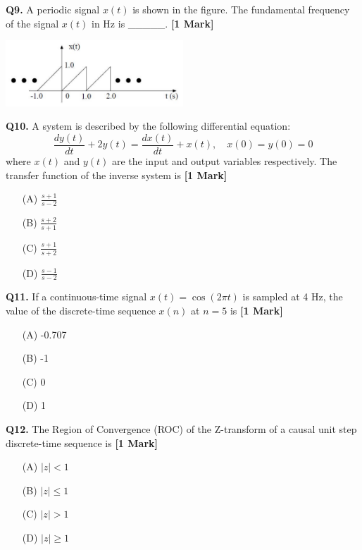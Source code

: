 \documentclass[11pt]{article}
\newcommand{\questiona}[2]{
    \noindent\textbf{Q#2.} #1 \hfill \textbf{[1 Mark]}
}
\begin{document}
\questiona{A periodic signal \( x(t) \) is shown in the figure. The fundamental frequency of the signal \( x(t) \) in Hz is \_\_\_\_\_.}{9}
\begin{center}
\includegraphics[width=0.5\textwidth]{figures/9.png}
\end{center}
\vspace{0.5cm}

\questiona{A system is described by the following differential equation:
\[\frac{dy(t)}{dt} + 2y(t) = \frac{dx(t)}{dt} + x(t), \quad x(0) = y(0) = 0\]
where \( x(t) \) and \( y(t) \) are the input and output variables respectively. The transfer function of the inverse system is}{10}
\begin{enumerate}
    \item[(A)] \(\frac{s+1}{s-2}\)  
    \item[(B)] \(\frac{s+2}{s+1}\)  
    \item[(C)] \(\frac{s+1}{s+2}\)  
    \item[(D)] \(\frac{s-1}{s-2}\)
\end{enumerate}
\vspace{0.5cm}

\questiona{If a continuous-time signal \( x(t) = \cos(2\pi t) \) is sampled at 4 Hz, the value of the discrete-time sequence \( x(n) \) at \( n = 5 \) is}{11}
\begin{enumerate}
    \item[(A)] -0.707  
    \item[(B)] -1  
    \item[(C)] 0  
    \item[(D)] 1  
\end{enumerate}
\vspace{0.5cm}

\questiona{The Region of Convergence (ROC) of the Z-transform of a causal unit step discrete-time sequence is}{12}
\begin{enumerate}
    \item[(A)] \(|z| < 1\)  
    \item[(B)] \(|z| \leq 1\)  
    \item[(C)] \(|z| > 1\)  
    \item[(D)] \(|z| \geq 1\)
\end{enumerate}
\vspace{0.5cm}
\end{document}
